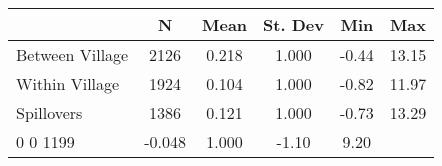 \begin{tabular}{l*{5}{c}}\hline&\multicolumn{1}{c}{N}&\multicolumn{1}{c}{Mean}&\multicolumn{1}{c}{St. Dev}&\multicolumn{1}{c}{Min}&\multicolumn{1}{c}{Max}\\ \hline 
Between Village & 2126 & 0.218 & 1.000 & -0.44 & 13.15 \\
Within Village & 1924 & 0.104 & 1.000 & -0.82 & 11.97 \\
Spillovers & 1386 & 0.121 & 1.000 & -0.73 & 13.29 \\
0 0 1199 & -0.048 & 1.000 & -1.10 & 9.20 \\
\hline \end{tabular}
